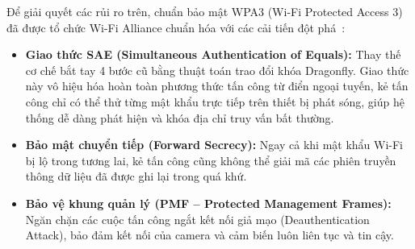 Để giải quyết các rủi ro trên, chuẩn bảo mật WPA3 (Wi-Fi Protected Access 3) đã được tổ chức Wi-Fi Alliance chuẩn hóa với các cải tiến đột phá~\cite{wpa3spec2020}:
\begin{itemize}
    \item \textbf{Giao thức SAE (Simultaneous Authentication of Equals):} Thay thế cơ chế bắt tay 4 bước cũ bằng thuật toán trao đổi khóa Dragonfly. Giao thức này vô hiệu hóa hoàn toàn phương thức tấn công từ điển ngoại tuyến, kẻ tấn công chỉ có thể thử từng mật khẩu trực tiếp trên thiết bị phát sóng, giúp hệ thống dễ dàng phát hiện và khóa địa chỉ truy vấn bất thường.
    \item \textbf{Bảo mật chuyển tiếp (Forward Secrecy):} Ngay cả khi mật khẩu Wi-Fi bị lộ trong tương lai, kẻ tấn công cũng không thể giải mã các phiên truyền thông dữ liệu đã được ghi lại trong quá khứ.
    \item \textbf{Bảo vệ khung quản lý (PMF -- Protected Management Frames):} Ngăn chặn các cuộc tấn công ngắt kết nối giả mạo (Deauthentication Attack), bảo đảm kết nối của camera và cảm biến luôn liên tục và tin cậy.
\end{itemize}
